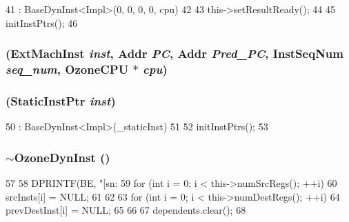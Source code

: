 \begin{DoxyCode}
41     : BaseDynInst<Impl>(0, 0, 0, 0, cpu)
42 {
43     this->setResultReady();
44 
45     initInstPtrs();
46 }
\end{DoxyCode}
\hypertarget{classOzoneDynInst_a4add552cfa23478e47fd76f306e824a3}{
\subsubsection[{OzoneDynInst}]{ ({\bf ExtMachInst} {\em inst}, \/  {\bf Addr} {\em PC}, \/  {\bf Addr} {\em Pred\_\-PC}, \/  {\bf InstSeqNum} {\em seq\_\-num}, \/  {\bf OzoneCPU} $\ast$ {\em cpu})}}
\label{classOzoneDynInst_a4add552cfa23478e47fd76f306e824a3}
\hypertarget{classOzoneDynInst_a9beb8a1e92eb999f4d1a304ff8ac9ff1}{
\subsubsection[{OzoneDynInst}]{ ({\bf StaticInstPtr} {\em inst})}}
\label{classOzoneDynInst_a9beb8a1e92eb999f4d1a304ff8ac9ff1}



\begin{DoxyCode}
50     : BaseDynInst<Impl>(_staticInst)
51 {
52     initInstPtrs();
53 }
\end{DoxyCode}
\hypertarget{classOzoneDynInst_a29f7890cfe51b11cee12ebd8023d0d48}{
\subsubsection[{$\sim$OzoneDynInst}]{\setlength{\rightskip}{0pt plus 5cm}$\sim${\bf OzoneDynInst} ()}}
\label{classOzoneDynInst_a29f7890cfe51b11cee12ebd8023d0d48}



\begin{DoxyCode}
57 {
58     DPRINTF(BE, "[sn:%
59     for (int i = 0; i < this->numSrcRegs(); ++i) {
60         srcInsts[i] = NULL;
61     }
62 
63     for (int i = 0; i < this->numDestRegs(); ++i) {
64         prevDestInst[i] = NULL;
65     }
66 
67     dependents.clear();
68 }
\end{DoxyCode}


